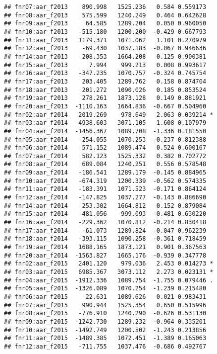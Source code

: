 \documentclass[
]{article}
\begin{document}
\begin{verbatim}
## fnr07:aar_f2013    890.998   1525.236   0.584 0.559173    
## fnr08:aar_f2013    575.599   1240.249   0.464 0.642628    
## fnr09:aar_f2013     64.585   1289.204   0.050 0.960050    
## fnr10:aar_f2013   -515.180   1200.200  -0.429 0.667793    
## fnr11:aar_f2013   1179.371   1071.062   1.101 0.270979    
## fnr12:aar_f2013    -69.430   1037.183  -0.067 0.946636    
## fnr14:aar_f2013    208.353   1664.208   0.125 0.900381    
## fnr15:aar_f2013      7.994    999.213   0.008 0.993617    
## fnr16:aar_f2013   -347.235   1070.757  -0.324 0.745754    
## fnr17:aar_f2013    203.405   1289.762   0.158 0.874704    
## fnr18:aar_f2013    201.272   1090.026   0.185 0.853524    
## fnr19:aar_f2013    278.261   1873.128   0.149 0.881921    
## fnr20:aar_f2013  -1110.163   1664.836  -0.667 0.504960    
## fnr02:aar_f2014   2019.269    978.649   2.063 0.039214 *  
## fnr03:aar_f2014   4938.603   3071.105   1.608 0.107979    
## fnr04:aar_f2014  -1456.367   1089.708  -1.336 0.181550    
## fnr05:aar_f2014   -254.055   1070.253  -0.237 0.812388    
## fnr06:aar_f2014    571.152   1089.474   0.524 0.600167    
## fnr07:aar_f2014    582.123   1525.332   0.382 0.702772    
## fnr08:aar_f2014    689.084   1240.251   0.556 0.578548    
## fnr09:aar_f2014   -186.541   1289.179  -0.145 0.884965    
## fnr10:aar_f2014   -674.319   1200.339  -0.562 0.574335    
## fnr11:aar_f2014   -183.391   1071.523  -0.171 0.864124    
## fnr12:aar_f2014   -147.825   1037.277  -0.143 0.886690    
## fnr14:aar_f2014    253.302   1664.812   0.152 0.879084    
## fnr15:aar_f2014   -481.056    999.093  -0.481 0.630220    
## fnr16:aar_f2014   -229.362   1070.812  -0.214 0.830418    
## fnr17:aar_f2014    -61.073   1289.824  -0.047 0.962239    
## fnr18:aar_f2014   -393.115   1090.258  -0.361 0.718459    
## fnr19:aar_f2014   1688.165   1873.121   0.901 0.367563    
## fnr20:aar_f2014  -1563.827   1665.176  -0.939 0.347778    
## fnr02:aar_f2015   2401.120    979.036   2.453 0.014273 *  
## fnr03:aar_f2015   6985.367   3073.112   2.273 0.023131 *  
## fnr04:aar_f2015  -1912.336   1089.754  -1.755 0.079446 .  
## fnr05:aar_f2015  -1326.089   1070.254  -1.239 0.215480    
## fnr06:aar_f2015     22.631   1089.626   0.021 0.983431    
## fnr07:aar_f2015    990.944   1525.354   0.650 0.515996    
## fnr08:aar_f2015   -776.910   1240.290  -0.626 0.531130    
## fnr09:aar_f2015  -1242.730   1289.232  -0.964 0.335201    
## fnr10:aar_f2015  -1492.749   1200.502  -1.243 0.213856    
## fnr11:aar_f2015  -1489.385   1072.451  -1.389 0.165063    
## fnr12:aar_f2015   -711.755   1037.476  -0.686 0.492767    

\end{verbatim}
\end{document}

